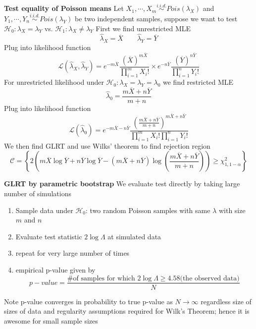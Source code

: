 \documentclass[11pt]{article}
\begin{document}
\begin{example}
  \textbf{Test equality of Poisson means} Let $X_1, \cdots, X_m \stackrel{i.i.d.}{\sim} Pois(\lambda_X)$ and $Y_1, \cdots, Y_n \stackrel{i.i.d.}{\sim} Pois(\lambda_Y)$ be two independent samples, suppose we want to test $\mathcal{H}_0: \lambda_X = \lambda_Y$ vs. $\mathcal{H}_1: \lambda_X \neq \lambda_Y$ First we find unrestricted MLE
  \[
    \hat{\lambda}_X = \overline{X} \quad \quad \hat{\lambda}_Y = \overline{Y}
  \]
  Plug into likelihood function
  \[
    \mathcal{L}(\hat{\lambda}_X, \hat{\lambda}_Y) = e^{-m\overline{X}} \frac{(\overline{X})^{m\overline{X}}}{\prod_{i=1}^m X_i!} \times
    e^{-n\overline{Y}} \frac{(\overline{Y})^{n\overline{Y}}}{\prod_{i=1}^n Y_i!}
  \]
  For unrestricted likelihood under $\mathcal{H}_0: \lambda_X = \lambda_Y = \lambda_0$ we find restricted MLE
  \[
    \hat{\lambda}_0 = \frac{m\overline{X} + n\overline{Y}}{m+n}
  \]
  Plug into likelihood function
  \[
    \mathcal{L}(\hat{\lambda}_0) = e^{-m\overline{X} - n\overline{Y}} \frac{\left( \frac{m\overline{X} + n\overline{Y}}{m+n} \right)^{m\overline{X} + n\overline{Y}}}{\prod_{i=1}^m X_i! \prod_{i=1}^n Y_i!}
  \]
  We then find GLRT and use Wilks' theorem to find rejection region
  \[
    \mathcal{C} = \left\{ 2\left(m\overline{X}\log \overline{Y} + n\overline{Y}\log\overline{Y} - (m\overline{X} + n\overline{Y})\log \left(\frac{m\overline{X} + n\overline{Y}}{m+n}\right)\right) \geq \chi_{1,1-\alpha}^2 \right\}
  \]
\end{example}


\begin{defn*}
  \textbf{GLRT by parametric bootstrap} We evaluate test directly by taking large number of simulations
  \begin{enumerate}
    \item Sample data under $\mathcal{H}_0$: two random Poisson samples with same $\lambda$ with size $m$ and $n$
    \item Evaluate test statistic $2\log \Lambda$ at simulated data
    \item repeat for very large number of times
    \item empirical p-value given by
    \[
      p-value = \frac{\text{\# of samples for which }2\log \Lambda \geq 4.58 \text{(the observed data)}}{N}
    \]
  \end{enumerate}
  Note p-value converges in probability to true p-value as $N \to \infty$ regardless size of sizes of data and regularity assumptions required for Wilk's Theorem; hence it is awesome for small sample sizes
\end{defn*}
\end{document}
